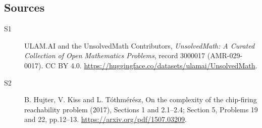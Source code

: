 \documentclass[11pt]{article}
\begin{document}
\subsection{Sources}
\begin{description}
\item[\hypertarget{source:3000017:1}{S1}] ULAM.AI and the UnsolvedMath Contributors, \emph{UnsolvedMath: A Curated Collection of Open Mathematics Problems}, record 3000017 (AMR-029-0017). CC BY 4.0. \url{https://huggingface.co/datasets/ulamai/UnsolvedMath}.
\item[\hypertarget{source:3000017:2}{S2}] B. Hujter, V. Kiss and L. Tóthmérész, On the complexity of the chip-firing reachability problem (2017), Sections 1 and 2.1--2.4; Section 5, Problems 19 and 22, pp.12--13. \url{https://arxiv.org/pdf/1507.03209}.
\end{description}
\label{end:3000017}
\end{document}
